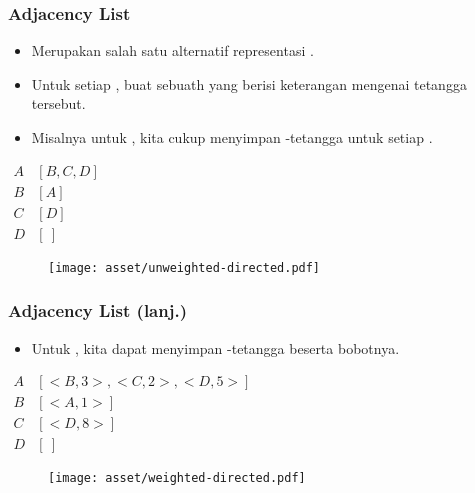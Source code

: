 \begin{frame}
\frametitle{Adjacency List}
\begin{itemize}
  \item Merupakan salah satu alternatif representasi \fgraph.
  \item Untuk setiap \fnode, buat sebuath \flist yang berisi keterangan mengenai tetangga \fnode tersebut.
  \item Misalnya untuk  \fgraph, kita cukup menyimpan \fnode-\fnode tetangga untuk setiap \fnode.
\end{itemize}
\begin{center}
\begin{multicols}{2}
  $\begin{array}{r|l}
    A & [B, C, D] \\
    B & [A] \\
    C & [D] \\
    D & [\ ]
  \end{array}$
  \break
  \begin{figure}
    \texttt{[image: asset/unweighted-directed.pdf]}
  \end{figure}
\end{multicols} 
\end{center}
\end{frame}

\begin{frame}
\frametitle{Adjacency List (lanj.)}
\begin{itemize}
  \item Untuk  \fgraph, kita dapat menyimpan \fnode-\fnode tetangga beserta bobotnya.
\end{itemize}
\begin{center}
\begin{multicols}{2}
  $\begin{array}{r|l}
    A & [<B,3> , <C,2>, <D,5>] \\
    B & [<A,1>] \\
    C & [<D,8>] \\
    D & [\ ]
  \end{array}$
  \break
  \begin{figure}
    \texttt{[image: asset/weighted-directed.pdf]}
  \end{figure}
\end{multicols} 
\end{center}
\end{frame}

